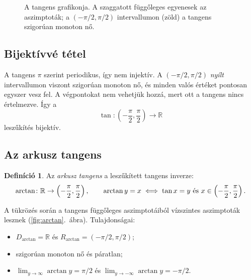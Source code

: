 \documentclass[11pt]{scrartcl}
\theoremstyle{definition}
\newtheorem{definition}{Definíció}
\theoremstyle{remark}
\begin{document}
\begin{figure}[ht]
	\centering
	\caption{A tangens grafikonja. A szaggatott függőleges egyenesek az
		aszimptoták; a $\left(-\pi / 2, \pi / 2\right)$ intervallumon (zöld) a
		tangens szigorúan monoton nő.}
	\label{fig:tangent}
\end{figure}

\subsection{Bijektívvé tétel}

A tangens $\pi$ szerint periodikus, így nem injektív. A
$\left(-\pi / 2, \pi / 2\right)$ \emph{nyílt} intervallumon
viszont szigorúan monoton nő, és minden valós értéket pontosan egyszer vesz
fel. A végpontokat nem vehetjük hozzá, mert ott a tangens nincs értelmezve.
Így a
\[
	\tan\colon \left(-\frac{\pi}{2}, \frac{\pi}{2}\right) \to \mathbb{R}
\]
leszűkítés bijektív.

\subsection{Az arkusz tangens}

\begin{definition}
	Az \emph{arkusz tangens} a leszűkített tangens inverze:
	\[
		\arctan\colon \mathbb{R} \to \left(-\frac{\pi}{2}, \frac{\pi}{2}\right),
		\qquad
		\arctan y = x \iff \tan x = y \text{ és }
		x \in \left(-\frac{\pi}{2}, \frac{\pi}{2}\right)\text.
	\]
\end{definition}

A tükrözés során a tangens függőleges aszimptotáiból vízszintes aszimptoták
lesznek (\ref{fig:arctan}.~ábra). Tulajdonságai:
\begin{itemize}
	\item $D_{\arctan} = \mathbb{R}$ és
	      $R_{\arctan} = \left(-\pi / 2, \pi / 2\right)$;
	\item szigorúan monoton nő és páratlan;
	\item $\displaystyle\lim_{y \to \infty} \arctan y = \pi/2$ és
	      $\displaystyle\lim_{y \to -\infty} \arctan y = -\pi/2$.
\end{itemize}
\end{document}
